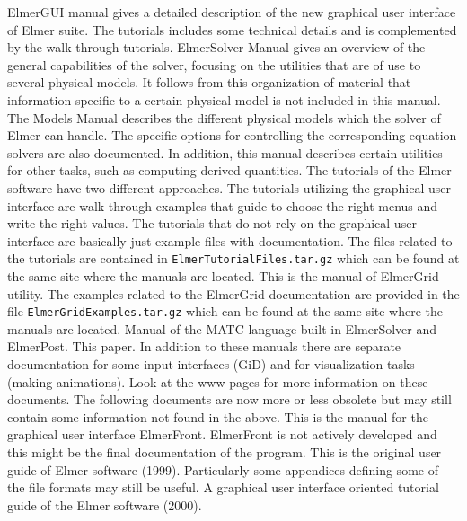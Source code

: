 \sifbegin
{}
	ElmerGUI manual gives a detailed description of the new graphical user interface of Elmer suite.
 	The tutorials includes some technical details and is complemented by the walk-through tutorials.
	ElmerSolver Manual gives an overview of the general capabilities of the solver,
        focusing on the utilities that are of use to several physical models. It follows 
        from this organization of material that information specific to a certain physical 
        model is not included in this manual.
	The Models Manual describes the different physical models which the solver of Elmer can handle.
        The specific options for controlling the corresponding equation solvers are also documented. 
        In addition, this manual describes certain utilities for other tasks, such as computing
        derived quantities.  
	The tutorials of the Elmer software have two different approaches. The tutorials utilizing the 
	graphical user interface are walk-through examples that guide to choose the right menus and
	write the right values. The tutorials that do not rely on the graphical user interface
 	are basically just example files with documentation.
        The files related to the tutorials are contained in 
	\texttt{ElmerTutorialFiles.tar.gz} which can be found at the same site where the manuals
        are located.
	This is the manual of ElmerGrid utility. The
	examples related to the ElmerGrid documentation are provided in the file 
	\texttt{ElmerGridExamples.tar.gz} which can be found at the same site where the manuals
        are located.
	Manual of the MATC language built in ElmerSolver and ElmerPost.
	This paper.
\sifend
In addition to these manuals there are separate documentation for some input interfaces (GiD) and
for visualization tasks (making animations). Look at the www-pages for more information on these
documents. The following documents are now more or less obsolete but may still contain some 
information not found in the above.
\sifbegin
{}
	This is the manual for the graphical user interface ElmerFront. ElmerFront is not actively developed 
	and this might be the final documentation of the program.
	This is the original user guide of Elmer software (1999). Particularly some appendices 
        defining some of the file formats may still be useful.
	A graphical user interface oriented tutorial guide of the Elmer software (2000). 
\sifend





